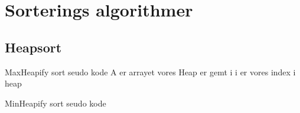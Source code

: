\documentclass[letterpaper,10pt,danish]{sphinxmanual}
\begin{document}
\sphinxstepscope


\section{Sorterings algorithmer}
\label{\detokenize{Algorithmer/Sorting:sorterings-algorithmer}}\label{\detokenize{Algorithmer/Sorting::doc}}

\subsection{Heapsort}
\label{\detokenize{Algorithmer/Sorting:heapsort}}
\sphinxAtStartPar
Max\sphinxhyphen{}Heapify sort
seudo kode
A er arrayet vores Heap er gemt i
i er vores index i heap

\begin{sphinxVerbatim}[commandchars=\\\{\}]
  

   
  

     \PYG{p}{[}\PYG{p}{]}  \PYG{p}{[}\PYG{p}{]}
      
   
     \PYG{p}{[}\PYG{p}{]}  \PYG{p}{[}\PYG{p}{]}
      
   
     \PYG{p}{[}\PYG{p}{]}  \PYG{p}{[}\PYG{p}{]}
\end{sphinxVerbatim}

\sphinxAtStartPar
Min\sphinxhyphen{}Heapify sort
seudo kode
\end{document}
